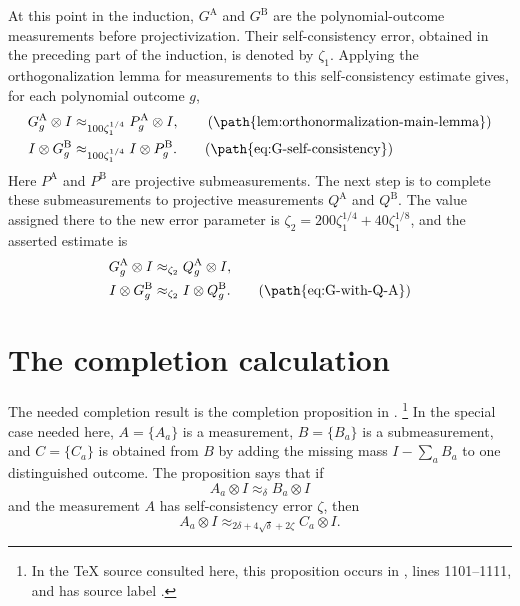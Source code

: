 \documentclass[11pt]{article}
\newcommand{\dd}{\delta}
\newcommand{\zz}{\zeta}
\begin{document}
At this point in the induction, \(G^{\mathrm A}\) and \(G^{\mathrm B}\) are the
polynomial-outcome measurements before projectivization.  Their
self-consistency error, obtained in the preceding part of the induction, is
denoted by \(\zeta_1\).  Applying the orthogonalization lemma for measurements to
this self-consistency estimate gives, for each polynomial outcome \(g\),
\begin{align*}
  G^{\mathrm A}_g \otimes I
    &\approx_{100\zeta_1^{1/4}}
  P^{\mathrm A}_g \otimes I,
    \tag{\path{lem:orthonormalization-main-lemma}}\\
  I \otimes G^{\mathrm B}_g
    &\approx_{100\zeta_1^{1/4}}
  I \otimes P^{\mathrm B}_g.
    \tag{\path{eq:G-self-consistency}}
\end{align*}
Here \(P^{\mathrm A}\) and \(P^{\mathrm B}\) are projective submeasurements.  The
next step is to complete
these submeasurements to projective measurements \(Q^{\mathrm A}\) and
\(Q^{\mathrm B}\).  The value assigned there to the new error parameter is
\(\zeta_2=200\zeta_1^{1/4}+40\zeta_1^{1/8}\), and the asserted estimate is
\begin{align*}
  G^{\mathrm A}_g \otimes I
    &\approx_{\zeta_2}
  Q^{\mathrm A}_g \otimes I,\\
  I \otimes G^{\mathrm B}_g
    &\approx_{\zeta_2}
  I \otimes Q^{\mathrm B}_g.
    \tag{\path{eq:G-with-Q-A}}
\end{align*}

\section{The completion calculation}

The needed completion result is the completion proposition in
\cite[Section~\emph{Preliminaries}]{Ji2020LowIndividualDegree}.
\footnote{In the TeX source consulted here, this proposition occurs in
, lines 1101--1111, and has source label
.}
In the special case needed here, \(A=\{A_a\}\) is a measurement, \(B=\{B_a\}\)
is a submeasurement, and \(C=\{C_a\}\) is obtained from \(B\) by adding the
missing mass \(I-\sum_a B_a\) to one distinguished outcome.  The proposition
says that if
\[
  A_a\otimes I \approx_{\dd} B_a\otimes I
\]
and the measurement \(A\) has self-consistency error \(\zz\), then
\[
  A_a\otimes I
    \approx_{2\dd+4\sqrt{\dd}+2\zz}
  C_a\otimes I.
\]
\end{document}
